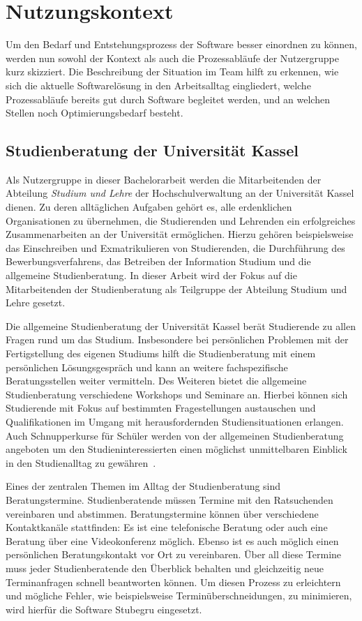 \chapter{Nutzungskontext}
\label{chapter:user-context}

Um den Bedarf und Entstehungsprozess der Software besser einordnen zu können,
werden nun sowohl der Kontext als auch die Prozessabläufe der Nutzergruppe kurz
skizziert. Die Beschreibung der Situation im Team hilft zu erkennen, wie sich
die aktuelle Softwarelösung in den Arbeitsalltag eingliedert, welche
Prozessabläufe bereits gut durch Software begleitet werden, und an welchen
Stellen noch Optimierungsbedarf besteht.

\section{Studienberatung der Universität Kassel}
Als Nutzergruppe in dieser Bachelorarbeit werden die Mitarbeitenden der
Abteilung \textit{Studium und Lehre} der Hochschulverwaltung an der Universität
Kassel dienen. Zu deren alltäglichen Aufgaben gehört es, alle erdenklichen
Organisationen zu übernehmen, die Studierenden und Lehrenden ein erfolgreiches
Zusammenarbeiten an der Universität ermöglichen. Hierzu gehören beispielsweise
das Einschreiben und Exmatrikulieren von Studierenden, die Durchführung des
Bewerbungsverfahrens, das Betreiben der Information Studium und die allgemeine
Studienberatung. In dieser Arbeit wird der Fokus auf die Mitarbeitenden der
Studienberatung als Teilgruppe der Abteilung Studium und Lehre gesetzt.

Die allgemeine Studienberatung der Universität Kassel berät Studierende zu
allen Fragen rund um das Studium. Insbesondere bei persönlichen Problemen mit
der Fertigstellung des eigenen Studiums hilft die Studienberatung mit einem
persönlichen Lösungsgespräch und kann an weitere fachspezifische
Beratungsstellen weiter vermitteln. Des Weiteren bietet die allgemeine
Studienberatung verschiedene Workshops und Seminare an. Hierbei können sich
Studierende mit Fokus auf bestimmten Fragestellungen austauschen und
Qualifikationen im Umgang mit herausfordernden Studiensituationen erlangen.
Auch Schnupperkurse für Schüler werden von der allgemeinen Studienberatung
angeboten um den Studieninteressierten einen möglichst unmittelbaren Einblick
in den Studienalltag zu gewähren~\cite{studBeratungKsWeb}.

Eines der zentralen Themen im Alltag der Studienberatung sind Beratungstermine.
Studienberatende müssen Termine mit den Ratsuchenden vereinbaren und abstimmen.
Beratungstermine können über verschiedene Kontaktkanäle stattfinden: Es ist
eine telefonische Beratung oder auch eine Beratung über eine Videokonferenz
möglich. Ebenso ist es auch möglich einen persönlichen Beratungskontakt vor Ort
zu vereinbaren. Über all diese Termine muss jeder Studienberatende den
Überblick behalten und gleichzeitig neue Terminanfragen schnell beantworten
können. Um diesen Prozess zu erleichtern und mögliche Fehler, wie
beispielsweise Terminüberschneidungen, zu minimieren, wird hierfür die Software
\gls{Stubegru} eingesetzt.

